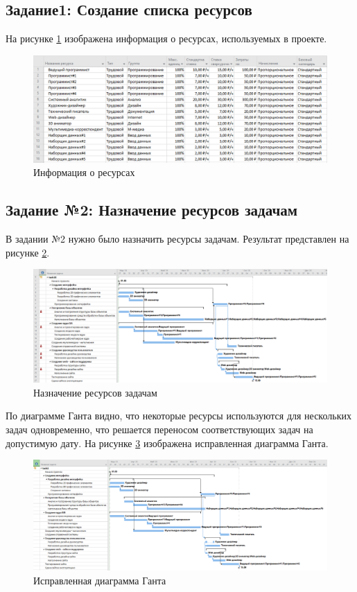 \subsection*{Задание1: Создание списка ресурсов}

На рисунке \ref{p4} изображена информация о ресурсах, используемых в проекте.
\begin{figure}[!h]
	\centering
	\includegraphics[width=1\linewidth]{inc/img/4.png}
	\caption{Информация о ресурсах}
	\label{p4}
\end{figure}

\newpage
\subsection*{Задание №2: Назначение ресурсов задачам}
В задании №2 нужно было назначить ресурсы задачам. Результат представлен на рисунке \ref{p5}.
\begin{figure}[!h]
	\centering
	\includegraphics[width=1\linewidth]{inc/img/5.png}
	\caption{Назначение ресурсов задачам}
	\label{p5}
\end{figure}

По диаграмме Ганта видно, что некоторые ресурсы используются для нескольких задач одновременно, что решается переносом соответствующих задач на допустимую дату. На рисунке \ref{p6} изображена исправленная диаграмма Ганта.

\begin{figure}[!h]
	\centering
	\includegraphics[width=1\linewidth]{inc/img/6.png}
	\caption{Исправленная диаграмма Ганта}
	\label{p6}
\end{figure}


